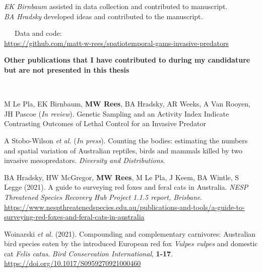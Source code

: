 \documentclass[11pt,a4paper,titlepage,twoside,openright]{style/unimelbthesis}
\begin{document}
\begin{frontmatter}
\begin{preface}
    \hspace*{0.333em}\hspace*{0.333em}\hspace*{0.333em}\hspace*{0.333em}\hspace*{0.333em}\hspace*{0.333em}\hspace*{0.333em}\hspace*{0.333em}\emph{EK Birnbaum} assisted in data collection and contributed to manuscript.\\
    \hspace*{0.333em}\hspace*{0.333em}\hspace*{0.333em}\hspace*{0.333em}\hspace*{0.333em}\hspace*{0.333em}\hspace*{0.333em}\hspace*{0.333em}\emph{BA Hradsky} developed ideas and contributed to the manuscript.
    
    ~~~Data and code:\\
    \url{https://github.com/matt-w-rees/spatiotemporal-gams-invasive-predators}
    
    \newpage
    
    \textbf{Other publications that I have contributed to during my candidature but are not presented in this thesis}
    
    \(~\)
    
    M Le Pla, EK Birnbaum, \textbf{MW Rees}, BA Hradsky, AR Weeks, A Van Rooyen, JH Pascoe (\emph{In review}). Genetic Sampling and an Activity Index Indicate Contrasting Outcomes of Lethal Control for an Invasive Predator
    
    A Stobo-Wilson \emph{et al.} (\emph{In press}). Counting the bodies: estimating the numbers and spatial variation of Australian reptiles, birds and mammals killed by two invasive mesopredators. \emph{Diversity and Distributions}.
    
    BA Hradsky, HW McGregor, \textbf{MW Rees}, M Le Pla, J Keem, BA Wintle, S Legge (2021). A guide to surveying red foxes and feral cats in Australia. \emph{NESP Threatened Species Recovery Hub Project 1.1.5 report, Brisbane}.
    \url{https://www.nespthreatenedspecies.edu.au/publications-and-tools/a-guide-to-surveying-red-foxes-and-feral-cats-in-australia}
    
    Woinarski \emph{et al.} (2021). Compounding and complementary carnivores: Australian bird species eaten by the introduced European red fox \emph{Vulpes vulpes} and domestic cat \emph{Felis catus}. \emph{Bird Conservation International}, \textbf{1-17}. \url{https://doi.org/10.1017/S0959270921000460}
    

\end{preface}
\end{frontmatter}
\end{document}
